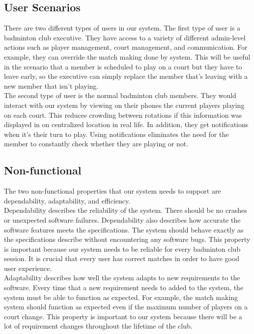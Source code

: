 \documentclass{article}
\begin{document}
\subsection{User Scenarios}
There are two different types of users in our system. The first type of user is
a badminton club executive. They have access to a variety of different admin-level
actions such as player management, court management, and communication.
For example, they can override the match making done by system. This will be useful
in the scenario that a member is scheduled to play on a court but they have to leave
early, so the executive can simply replace the member that's leaving with a new
member that isn't playing. \\

The second type of user is the normal badminton club members. They would interact
with our system by viewing on their phones the current players playing on each court.
This reduces crowding between rotations if this information was displayed in on
centralized location in real life. In addition, they get notifications when
it's their turn to play. Using notifications eliminates the need for the member
to constantly check whether they are playing or not.

\subsection{Non-functional}
The two non-functional properties that our system needs to support are dependability, adaptability, and efficiency. \\

Dependability describes the reliability of the system.
There should be no crashes or unexpected software failures.
Dependability also describes how accurate the software features meets the specifications.
The system should behave exactly as the specifications describe without encountering any software bugs.
This property is important because our system needs to be reliable for every badminton club session.
It is crucial that every user has correct matches in order to have good user experience. \\

Adaptability describes how well the system adapts to new requirements to the software.
Every time that a new requirement needs to added to the system, the system must be able to function as expected.
For example, the match making system should function as expected even if the maximum number of players on a court change.
This property is important to our system because there will be a lot of requirement changes throughout the lifetime of the club. \\
\end{document}
